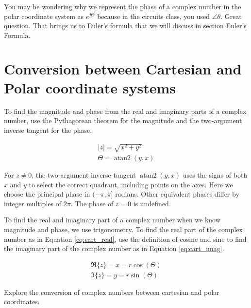 \documentclass{ximera}
\begin{document}
You may be wondering why we represent the phase of a complex number in the polar coordinate system as  $e^{j \Theta}$ because in the circuits class, you used $ \angle \theta $. Great question. That brings us to Euler's formula that we will discuss in section Euler's Formula.

\section{Conversion between Cartesian and Polar coordinate systems}
  
To find the magnitude and phase from the real and imaginary
parts of a complex number, use the Pythagorean theorem for
the magnitude and the two-argument inverse tangent for the phase.

\begin{eqnarray}
|z|=\sqrt{x^2+y^2} \label{eq:polar_mag}\\
\Theta = \operatorname{atan2}(y,x) \label{eq:polar_angle}
\end{eqnarray}

For $z\ne0$, the two-argument inverse tangent
$\operatorname{atan2}(y,x)$ uses the signs of both $x$ and $y$
to select the correct quadrant, including points on the axes.
Here we choose the principal phase in $(-\pi,\pi]$ radians.
Other equivalent phases differ by integer multiples of $2\pi$.
The phase of $z=0$ is undefined.
 
 
 To find the real and imaginary part of a complex number when we know magnitude and phase, we use trigonometry. To find the real part of the complex number as in Equation \ref{eq:cart_real}, use the definition of cosine and sine to find the imaginary part of the complex number as in Equation \ref{eq:cart_imag}.


\begin{eqnarray}
\Re \{z\} =x= r \cos (\Theta) \label{eq:cart_real}\\
\Im \{z\} =y= r \sin (\Theta)  \label{eq:cart_imag}
\end{eqnarray}


\begin{question}
Explore the conversion of complex numbers between cartesian and polar coordinates.
\begin{center}  
\end{center} 
\end{question}
\end{document}
